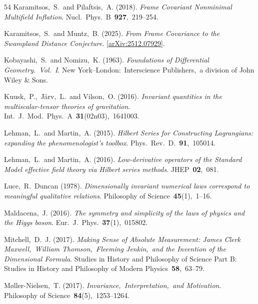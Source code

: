 \documentclass[12pt]{article}
\numberwithin{equation}{section}
\begin{document}
\begin{small}
\begin{thebibliography}{54}
{Karamitsos,~S.~and Pilaftsis,~A.} (2018).
{\em Frame Covariant Nonminimal Multifield Inflation}.
Nucl.~Phys.~B~\textbf{927},~219--254.

{Karamitsos,~S.~and Muntz,~B.} (2025).
{\em From Frame Covariance to the Swampland Distance Conjecture}.
[\href{https://arxiv.org/abs/2512.07929}{arXiv:2512.07929}].

{Kobayashi,~S.~and Nomizu,~K.} (1963).
{\em Foundations of Differential Geometry.~Vol.~I}.
New York--London:~Interscience Publishers,~a division of John Wiley \& Sons.

{Kuusk,~P.,~J\"arv,~L.~and Vilson,~O.} (2016).
{\em Invariant quantities in the multiscalar-tensor theories of gravitation}.
Int.~J.~Mod.~Phys.~A~\textbf{31}(02n03),~1641003.

{Lehman,~L.~and Martin,~A.} (2015).
{\em Hilbert Series for Constructing Lagrangians: expanding the phenomenologist's toolbox}.
Phys.~Rev.~D.~\textbf{91},~105014.

{Lehman,~L.~and Martin,~A.} (2016).
{\em Low-derivative operators of the Standard Model effective field theory via Hilbert series methods}.
JHEP~\textbf{02},~081.

{Luce,~R.~Duncan} (1978).
{\em Dimensionally invariant numerical laws correspond to meaningful qualitative relations}.
Philosophy of Science~\textbf{45}(1),~1--16.

{Maldacena,~J.} (2016).
{\em The symmetry and simplicity of the laws of physics and the Higgs boson}.
Eur.~J.~Phys.~\textbf{37}(1),~015802.

{Mitchell,~D.~J.} (2017).
{\em Making Sense of Absolute Measurement: James Clerk Maxwell,~William Thomson,~Fleeming Jenkin,~and the Invention of the Dimensional Formula}.
Studies in History and Philosophy of Science Part B: Studies in History and Philosophy of Modern Physics~\textbf{58},~63--79.

{M\o ller-Nielsen,~T.} (2017).
{\em Invariance,~Interpretation,~and Motivation}.
Philosophy of Science~\textbf{84}(5),~1253--1264.


\end{thebibliography}
\end{small}
\end{document}
